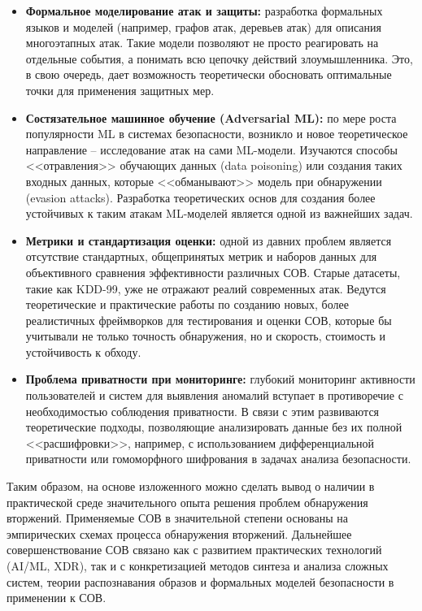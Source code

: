 \begin{itemize}
    \item \textbf{Формальное моделирование атак и защиты:} разработка формальных языков и моделей (например, графов атак, деревьев атак) для описания многоэтапных атак. Такие модели позволяют не просто реагировать на отдельные события, а понимать всю цепочку действий злоумышленника. Это, в свою очередь, дает возможность теоретически обосновать оптимальные точки для применения защитных мер.
    \item \textbf{Состязательное машинное обучение (Adversarial ML):} по мере роста популярности ML в системах безопасности, возникло и новое теоретическое направление -- исследование атак на сами ML-модели. Изучаются способы <<отравления>> обучающих данных (data poisoning) или создания таких входных данных, которые <<обманывают>> модель при обнаружении (evasion attacks). Разработка теоретических основ для создания более устойчивых к таким атакам ML-моделей является одной из важнейших задач.
    \item \textbf{Метрики и стандартизация оценки:} одной из давних проблем является отсутствие стандартных, общепринятых метрик и наборов данных для объективного сравнения эффективности различных СОВ. Старые датасеты, такие как KDD-99, уже не отражают реалий современных атак. Ведутся теоретические и практические работы по созданию новых, более реалистичных фреймворков для тестирования и оценки СОВ, которые бы учитывали не только точность обнаружения, но и скорость, стоимость и устойчивость к обходу.
    \item \textbf{Проблема приватности при мониторинге:} глубокий мониторинг активности пользователей и систем для выявления аномалий вступает в противоречие с необходимостью соблюдения приватности. В связи с этим развиваются теоретические подходы, позволяющие анализировать данные без их полной <<расшифровки>>, например, с использованием дифференциальной приватности или гомоморфного шифрования в задачах анализа безопасности.
\end{itemize}

Таким образом, на основе изложенного можно сделать вывод о наличии в практической среде значительного опыта решения проблем обнаружения вторжений. Применяемые СОВ в значительной степени основаны на эмпирических схемах процесса обнаружения вторжений. Дальнейшее совершенствование СОВ связано как с развитием практических технологий (AI/ML, XDR), так и с конкретизацией методов синтеза и анализа сложных систем, теории распознавания образов и формальных моделей безопасности в применении к СОВ.
